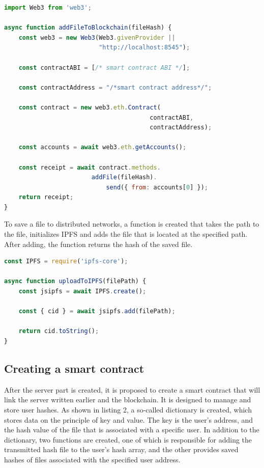 \documentclass[10pt,conference,a4paper]{IEEEtran_EDM}
\begin{document}
\begin{lstlisting}[language=JavaScript, caption=JavaScript code implementing saving to the blockchain]
import Web3 from 'web3';

async function addFileToBlockchain(fileHash) {
    const web3 = new Web3(Web3.givenProvider ||
                          "http://localhost:8545");

    const contractABI = [/* smart contract ABI */];

    const contractAddress = "/*smart contract address*/";

    const contract = new web3.eth.Contract(
                                        contractABI,
                                        contractAddress);

    const accounts = await web3.eth.getAccounts();

    const receipt = await contract.methods.
                        addFile(fileHash).
                            send({ from: accounts[0] });
    return receipt;
}
\end{lstlisting}

To save a file to distributed networks, a function is created that takes the path to the file, initializes IPFS and adds the file that is located at the specified path. After adding, the function returns the hash of the saved file.

\begin{lstlisting}[language=JavaScript, caption= Saving a file to IPFS]
const IPFS = require('ipfs-core');

async function uploadToIPFS(filePath) {
    const jsipfs = await IPFS.create();

    const { cid } = await jsipfs.add(filePath);

    return cid.toString();
}
\end{lstlisting}

\subsection{Creating a smart contract}
After the server part is created, it is proposed to create a smart contract that will link the server written earlier and the blockchain. It is designed to manage and store user hashes. As shown in listing 2, a so-called dictionary is created, which stores data on the principle of key and value. The key is the user's address, and the hash value of the file that is associated with a specific user. In addition to the dictionary, two functions are created, one of which is responsible for adding the transmitted hash file to the user's hash array, and the other provides saved hashes of files associated with the specified user address.
\end{document}
